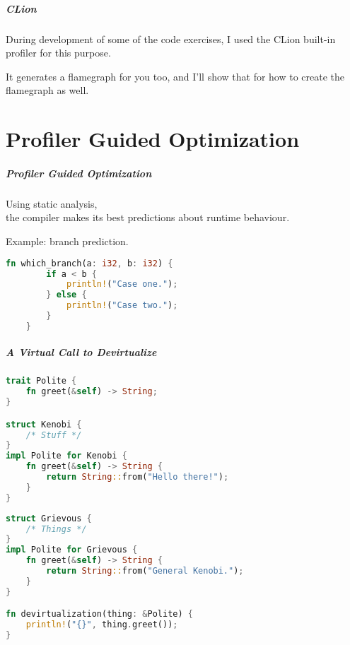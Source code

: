 \begin{frame}
\frametitle{CLion}

During development of some of the code exercises, I used the CLion built-in profiler for this purpose. 

It generates a flamegraph for you too, and I'll show that for how to create the flamegraph as well.


\end{frame}

\part{Profiler Guided Optimization}
\begin{frame}
\partpage
\end{frame}

\begin{frame}[fragile]
\frametitle{Profiler Guided Optimization}


Using static analysis, \\
the compiler makes its best predictions about runtime behaviour.

Example: branch prediction. 

\begin{lstlisting}[language=Rust]
    fn which_branch(a: i32, b: i32) {
        if a < b {
            println!("Case one.");
        } else {
            println!("Case two.");
        }
    }
\end{lstlisting}

\end{frame}

\begin{frame}[fragile]
\frametitle{A Virtual Call to Devirtualize}

\begin{multicols}{2}
\begin{lstlisting}[language=Rust]
trait Polite {
    fn greet(&self) -> String;
}

struct Kenobi {
    /* Stuff */
}
impl Polite for Kenobi {
    fn greet(&self) -> String {
        return String::from("Hello there!");
    }
}
\end{lstlisting}
\columnbreak
\begin{lstlisting}[language=Rust]
struct Grievous {
    /* Things */
}
impl Polite for Grievous {
    fn greet(&self) -> String {
        return String::from("General Kenobi.");
    }
}

fn devirtualization(thing: &Polite) {
    println!("{}", thing.greet());
}

\end{lstlisting}
\end{multicols}

\end{frame}


